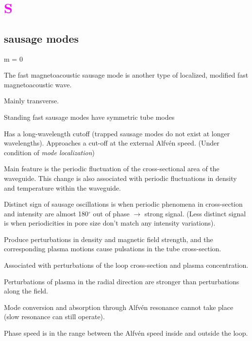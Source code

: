 \documentclass[12pt]{article}
\begin{document}
\section*{\textcolor{magenta}{S}}

\subsection*{sausage modes}
\begin{itemize*}
    \item m = 0
    \item The fast magnetoacoustic sausage mode is another type of
        localized, modified fast magnetoacoustic wave.
    \item Mainly transverse.
    \item Standing fast sausage modes have symmetric tube modes
    \item Has a long-wavelength cutoff (trapped sausage modes do
        not exist at longer wavelengths).
        Approaches a cut-off at the external Alfv\'en speed.
        (Under condition of \emph{mode localization})
    \item Main feature is the periodic fluctuation of the cross-sectional
        area of the waveguide. This change is also associated with
        periodic fluctuations in density and temperature within the
        waveguide.
    \item Distinct sign of sausage oscillations is when periodic
        phenomena in cross-section and intensity are almost
        180$^{\circ}$ out of phase $\rightarrow$ strong signal.
        (Less distinct signal is when periodicities in pore size
        don't match any intensity variations).
    \item Produce perturbations in density and magnetic field strength,
        and the corresponding plasma motions cause pulsations in the
        tube cross-section.
    \item Associated with perturbations of the loop cross-section
        and plasma concentration.
    \item Perturbations of plasma in the radial direction are stronger
        than perturbations along the field.
    \item Mode conversion and absorption through Alfv\'en resonance
        cannot take place (slow resonance can still operate).
    \item Phase speed is in the range between the Alfv\'en speed inside
        and outside the loop.
\end{itemize*}
\end{document}
